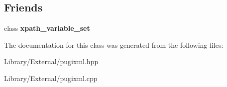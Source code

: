 \subsection*{Friends}
\begin{DoxyCompactItemize}
\item 
\hypertarget{classpugi_1_1xpath__variable_ae065e6f4380a8a530c7352703c09ff80}{}class {\bfseries xpath\+\_\+variable\+\_\+set}\label{classpugi_1_1xpath__variable_ae065e6f4380a8a530c7352703c09ff80}

\end{DoxyCompactItemize}


The documentation for this class was generated from the following files\+:\begin{DoxyCompactItemize}
\item 
Library/\+External/pugixml.\+hpp\item 
Library/\+External/pugixml.\+cpp\end{DoxyCompactItemize}
